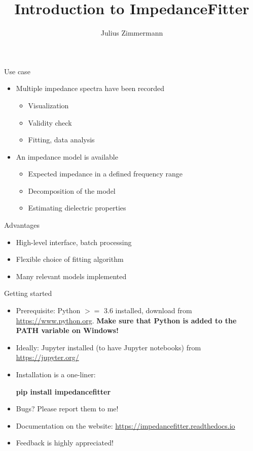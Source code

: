 \documentclass[11pt]{beamer}
\author{Julius Zimmermann}
\title{Introduction to ImpedanceFitter}
\begin{document}
\begin{frame}
\titlepage
\end{frame}


\begin{frame}{Use case}

\begin{itemize}
\item Multiple impedance spectra have been recorded
\begin{itemize}

\item Visualization 
\item Validity check
\item Fitting, data analysis

\end{itemize}
\item An impedance model is available
\begin{itemize}
\item Expected impedance in a defined frequency range
\item Decomposition of the model 
\item Estimating dielectric properties
\end{itemize}
\end{itemize}

\begin{block}{Advantages}
\begin{itemize}
\item High-level interface, batch processing
\item Flexible choice of fitting algorithm
\item Many relevant models implemented
\end{itemize}

\end{block}

\end{frame}

\begin{frame}{Getting started}
\begin{itemize}
\item Prerequisite: Python $>=$ 3.6 installed, download from \url{https://www.python.org}. \textbf{Make sure that Python is added to the PATH variable on Windows!}
\item Ideally: Jupyter installed (to have Jupyter notebooks) from \url{https://jupyter.org/}
\item Installation is a one-liner:
\begin{center}
\textbf{pip install impedancefitter}
\end{center}
\item Bugs? Please report them to me!
\item Documentation on the website: \url{https://impedancefitter.readthedocs.io}
\item Feedback is highly appreciated!
\end{itemize}

\end{frame}
\end{document}
